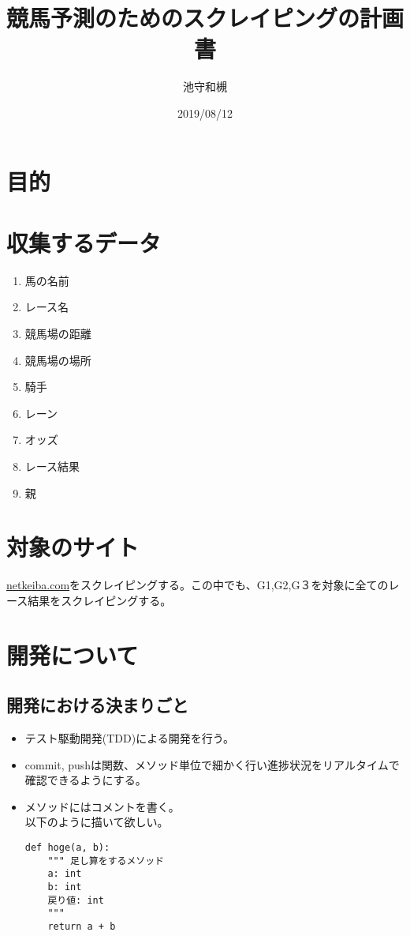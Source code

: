 \documentclass{jsarticle}
\begin{document}
\title{競馬予測のためのスクレイピングの計画書}
\author{池守和槻}
\date{2019/08/12}
\maketitle

\section{目的}
\section{収集するデータ}
  \begin{enumerate}
    \item 馬の名前
    \item レース名
    \item 競馬場の距離
    \item 競馬場の場所
    \item 騎手
    \item レーン
    \item オッズ
    \item レース結果
    \item 親
  \end{enumerate}
\section{対象のサイト}
  \href{https://www.netkeiba.com}{netkeiba.com}をスクレイピングする。この中でも、G1,G2,G３を対象に全てのレース結果をスクレイピングする。
\section{開発について}
  \subsection{開発における決まりごと}

    \begin{itemize}
      \item テスト駆動開発(TDD)による開発を行う。\\
      \item commit, pushは関数、メソッド単位で細かく行い進捗状況をリアルタイムで確認できるようにする。\\
      \item メソッドにはコメントを書く。\\
      以下のように描いて欲しい。
\begin{lstlisting}[caption=コメントの例,label=ラベル1]
  def hoge(a, b):
    """ 足し算をするメソッド
    a: int
    b: int
    戻り値: int
    """
    return a + b
\end{lstlisting}
    \end{itemize}
\end{document}
